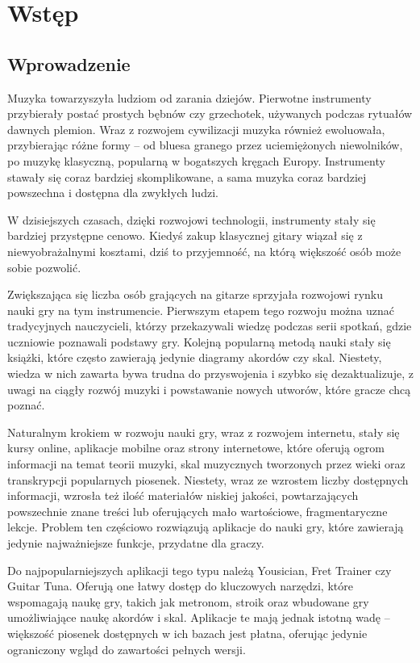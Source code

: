 \chapter{Wstęp}
\section{Wprowadzenie}

Muzyka towarzyszyła ludziom od zarania dziejów. Pierwotne instrumenty przybierały postać prostych bębnów czy grzechotek, używanych podczas rytuałów dawnych plemion. Wraz z rozwojem cywilizacji muzyka również ewoluowała, przybierając różne formy – od bluesa granego przez uciemiężonych niewolników, po muzykę klasyczną, popularną w bogatszych kręgach Europy. Instrumenty stawały się coraz bardziej skomplikowane, a sama muzyka coraz bardziej powszechna i dostępna dla zwykłych ludzi.

W dzisiejszych czasach, dzięki rozwojowi technologii, instrumenty stały się bardziej przystępne cenowo. Kiedyś zakup klasycznej gitary wiązał się z niewyobrażalnymi kosztami, dziś to przyjemność, na którą większość osób może sobie pozwolić.

Zwiększająca się liczba osób grających na gitarze sprzyjała rozwojowi rynku nauki gry na tym instrumencie. Pierwszym etapem tego rozwoju można uznać tradycyjnych nauczycieli, którzy przekazywali wiedzę podczas serii spotkań, gdzie uczniowie poznawali podstawy gry. Kolejną popularną metodą nauki stały się książki, które często zawierają jedynie diagramy akordów czy skal. Niestety, wiedza w nich zawarta bywa trudna do przyswojenia i szybko się dezaktualizuje, z uwagi na ciągły rozwój muzyki i powstawanie nowych utworów, które gracze chcą poznać.

Naturalnym krokiem w rozwoju nauki gry, wraz z rozwojem internetu, stały się kursy online, aplikacje mobilne oraz strony internetowe, które oferują ogrom informacji na temat teorii muzyki, skal muzycznych tworzonych przez wieki oraz transkrypcji popularnych piosenek. Niestety, wraz ze wzrostem liczby dostępnych informacji, wzrosła też ilość materiałów niskiej jakości, powtarzających powszechnie znane treści lub oferujących mało wartościowe, fragmentaryczne lekcje. Problem ten częściowo rozwiązują aplikacje do nauki gry, które zawierają jedynie najważniejsze funkcje, przydatne dla graczy.

Do najpopularniejszych aplikacji tego typu należą Yousician, Fret Trainer czy Guitar Tuna. Oferują one łatwy dostęp do kluczowych narzędzi, które wspomagają naukę gry, takich jak metronom, stroik oraz wbudowane gry umożliwiające naukę akordów i skal. Aplikacje te mają jednak istotną wadę – większość piosenek dostępnych w ich bazach jest płatna, oferując jedynie ograniczony wgląd do zawartości pełnych wersji.

